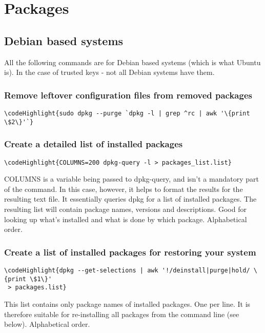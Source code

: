 \documentclass[12pt,a4paper]{article}
\begin{document}
\section{Packages}
\label{Packages}
\subsection{Debian based systems}
All the following commands are for Debian based systems (which is what Ubuntu is). In the case of trusted keys - not all Debian systems have them. 
\subsubsection{Remove leftover configuration files from removed packages}
\begin{Verbatim}[commandchars=\\\{\}]
\codeHighlight{sudo dpkg --purge `dpkg -l | grep ^rc | awk '\{print \$2\}'`}
\end{Verbatim}


\subsubsection{Create a detailed list of installed packages}
\begin{Verbatim}[commandchars=\\\{\}]
\codeHighlight{COLUMNS=200 dpkg-query -l > packages_list.list}
\end{Verbatim}
COLUMNS is a variable being passed to dpkg-query, and isn't a mandatory part of the command.  In this case, however, it helps to format the results for the resulting text file. It essentially queries dpkg for a list of installed packages. The resulting list will contain package names, versions and descriptions. Good for looking up what’s installed and what is done by which package. Alphabetical order.

\subsubsection{Create a list of installed packages for restoring your system}
\begin{Verbatim}[commandchars=\\\{\}]
\codeHighlight{dpkg --get-selections | awk '!/deinstall|purge|hold/ \{print \$1\}'
 > packages.list}
\end{Verbatim}
This list contains only package names of installed packages. One per line. It is therefore suitable for re-installing all packages from the command line (see below). Alphabetical order.
\end{document}
